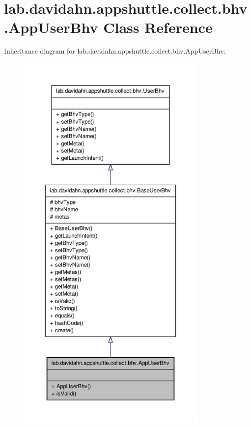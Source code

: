 \hypertarget{classlab_1_1davidahn_1_1appshuttle_1_1collect_1_1bhv_1_1_app_user_bhv}{\section{lab.\-davidahn.\-appshuttle.\-collect.\-bhv.\-App\-User\-Bhv \-Class \-Reference}
\label{classlab_1_1davidahn_1_1appshuttle_1_1collect_1_1bhv_1_1_app_user_bhv}
}


\-Inheritance diagram for lab.\-davidahn.\-appshuttle.\-collect.\-bhv.\-App\-User\-Bhv\-:
\nopagebreak
\begin{figure}[H]
\begin{center}
\leavevmode
\includegraphics[height=550pt]{classlab_1_1davidahn_1_1appshuttle_1_1collect_1_1bhv_1_1_app_user_bhv__inherit__graph}
\end{center}
\end{figure}


